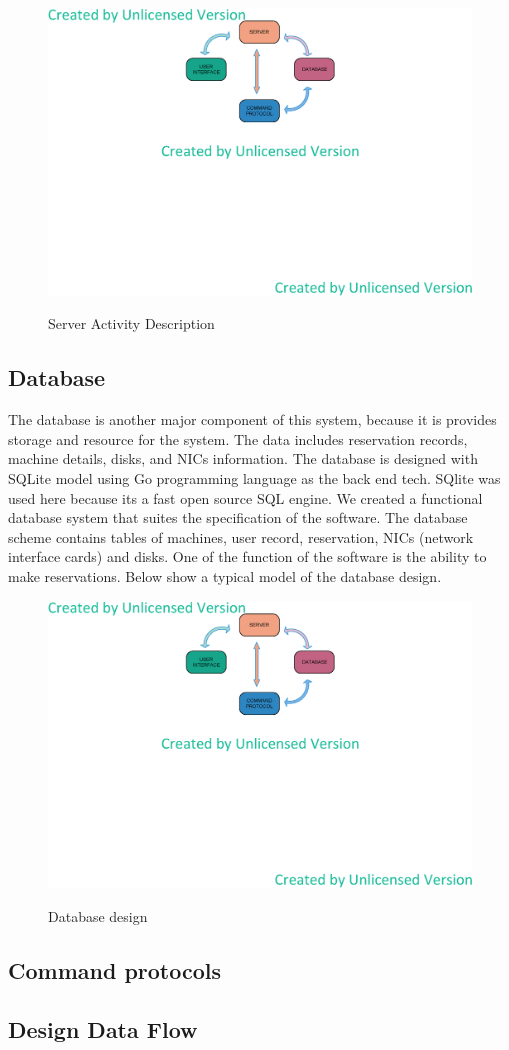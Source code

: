 \begin{figure}[h!]
\includegraphics[width = \linewidth]{design1.eps}
\label{fig:Description of Server Activity} 
\caption{Server Activity Description}
\end{figure}

\subsection{Database}
The database is another major component of this system, because it is provides storage and resource for the system. The data includes reservation records, machine details, disks, and NICs information. The database is designed with SQLite model using Go programming language as the back end tech. SQlite was used here because its a fast open source SQL engine. We created a functional database system that suites the specification of the software. 
The database scheme contains tables of machines, user record, reservation, NICs (network interface cards) and disks.  One of the function of the software is the ability to make reservations.  Below show a typical model of the database design.

 \begin{figure}[h!]
\includegraphics[width = \linewidth]{design1.eps}
\label{fig:Database Schema} 
\caption{Database design}
\end{figure}

\subsection{Command protocols}

\subsection{Design Data Flow}



